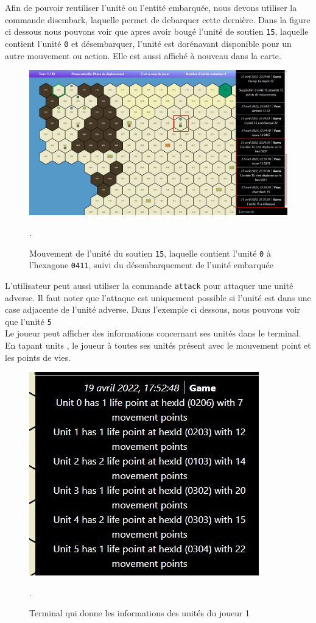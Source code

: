 Afin de pouvoir reutiliser l'unité ou l'entité embarquée, nous devons utiliser la commande disembark, laquelle permet de debarquer cette dernière.
Dans la figure ci dessous nous pouvons voir que apres avoir bougé l'unité de soutien {\tt 15}, laquelle contient l'unité {\tt 0} et désembarquer, l'unité est dorénavant disponible pour un autre mouvement ou action. Elle est aussi affiché à nouveau dans la carte.\\

\begin{figure}[H]
    \centering
    \includegraphics[scale=0.35]{data/Disembark.jpg}
    \caption{Mouvement de l'unité du soutien \lstinline{15}, laquelle contient l'unité \lstinline{0} à l'hexagone \lstinline{0411}, suivi du désembarquement de l'unité embarquée}.
\end{figure}

L'utilisateur peut aussi utiliser la commande {\tt attack} pour attaquer une unité adverse. Il faut noter que l'attaque est uniquement possible si l'unité est dans une case adjacente de l'unité adverse. Dans l'exemple ci dessous, nous pouvons voir que l'unité {\tt 5} \\

Le joueur peut afficher des informations concernant ses unités dans le terminal.
En tapant \og units \fg{}, le joueur à toutes ses unités présent avec le mouvement point et  les points de vies.\\
\begin{figure}[H]
\centering
\includegraphics[scale=0.6]{data/info_units.jpg}
\caption{Terminal qui donne les informations des unités du joueur 1 }.
\end{figure}

